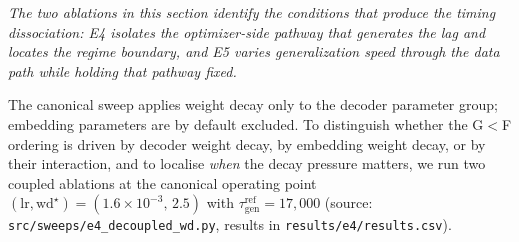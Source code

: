 \documentclass{article}
\newcommand{\taug}{\tau_{\mathrm{gen}}}
\begin{document}
\emph{The two ablations in this section identify the conditions
that produce the timing dissociation: E4 isolates the
optimizer-side pathway that generates the lag and locates the
regime boundary, and E5 varies generalization speed through the
data path while holding that pathway fixed.}

The canonical sweep applies weight decay only to the decoder
parameter group; embedding parameters are by default excluded.
To distinguish whether the G$<$F ordering is driven by decoder
weight decay, by embedding weight decay, or by their interaction,
and to localise \emph{when} the decay pressure matters, we run two
coupled ablations at the canonical operating point
$(\mathrm{lr},\mathrm{wd}^{\star}){=}(1.6{\times}10^{-3},\,2.5)$
with $\taug^{\mathrm{ref}}{=}17{,}000$
(source: \texttt{src/sweeps/e4\_decoupled\_wd.py},
results in \texttt{results/e4/results.csv}).
\end{document}
